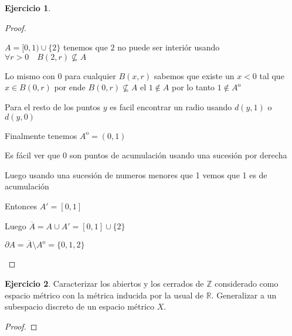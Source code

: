 \documentclass[12pt]{report}
\newcommand{\R}{\mathbb{R}}
\newcommand{\Z}{\mathbb{Z}}
\newcommand{\ol}{\overline}
\newcommand{\open}{\mathrm{o}}
\theoremstyle{definition}
\newtheorem{ej}{Ejercicio}
\begin{document}
\begin{ej}
\begin{proof}
\begin{enumerate}
$A = [0,1) \cup \{2\}$ tenemos que $2$ no puede ser interiór usando $\forall r > 0 \quad B(2,r) \not\subseteq A$

Lo mismo con $0$ para cualquier $B(x,r)$ sabemos que existe un $x < 0$ tal que $x \in B(0,r)$ por ende $B(0,r) \not\subseteq A$ el $1 \notin A$ por lo tanto $1 \notin A^{\open}$

Para el resto de los puntos $y$ es facil encontrar un radio usando $d(y,1)$ o $d(y,0)$  

Finalmente tenemos $A^{\open} = (0,1)$

Es fácil ver que $0$ son puntos de acumulación usando una sucesión por derecha

Luego usando una sucesión de numeros menores que 1 vemos que 1 es de acumulación 

Entonces $A' = [0,1] $

Luego $\ol A = A \cup A' = [0,1] \cup \{2\}$

$ \partial A = \ol{A} \setminus A^{\open} = \{0,1,2\} $
    \end{enumerate} 
  \end{proof}
\end{ej}

\begin{ej}
  Caracterizar los abiertos y los cerrados de $\Z$ considerado como espacio métrico con la métrica inducida por la usual de $\R$. Generalizar a un subespacio discreto de un espacio métrico $X$.
  \begin{proof}
      
  \end{proof}
\end{ej}
\end{document}
